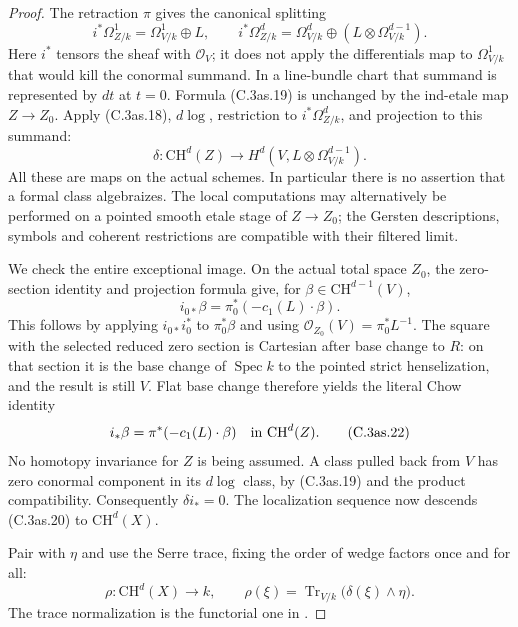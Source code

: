 \begin{proof}
The retraction $\pi$ gives the canonical splitting
\[
 i^*\Omega^1_{Z/k}=\Omega^1_{V/k}\oplus L,\qquad
 i^*\Omega^d_{Z/k}=\Omega^d_{V/k}
                         \oplus(L\otimes\Omega^{d-1}_{V/k}).
 \tag{C.3as.19}
\]
Here $i^*$ tensors the sheaf with $\mathcal O_V$; it does
not apply the differentials map to $\Omega^1_{V/k}$ that
would kill the conormal summand. In a line-bundle chart that
summand is represented by $dt$ at $t=0$. Formula (C.3as.19)
is unchanged by the ind-etale map $Z\to Z_0$.
Apply (C.3as.18), $d\log$, restriction to
$i^*\Omega^d_{Z/k}$, and projection to this summand:
\[
 \delta:\mathrm{CH}^d(Z)\longrightarrow
                     H^d(V,L\otimes\Omega^{d-1}_{V/k}).
 \tag{C.3as.20}
\]
All these are maps on the actual schemes. In particular there
is no assertion that a formal class algebraizes. The local
computations may alternatively be performed on a pointed
smooth etale stage of $Z\to Z_0$; the Gersten descriptions,
symbols and coherent restrictions are compatible with their
filtered limit.

We check the entire exceptional image. On the actual total
space $Z_0$, the zero-section identity and projection formula
give, for $\beta\in\mathrm{CH}^{d-1}(V)$,
\[
                  i_{0*}\beta
                    =\pi_0^*(-c_1(L)\cdot\beta).
 \tag{C.3as.21}
\]
This follows by applying $i_{0*}i_0^*$ to $\pi_0^*\beta$
and using $\mathcal O_{Z_0}(V)=\pi_0^*L^{-1}$.
The square with the selected reduced zero section is
Cartesian after base change to $R$: on that section it is
the base change of $\operatorname{Spec}k$ to the pointed
strict henselization, and the result is still $V$.
Flat base change therefore yields the literal Chow identity
\[
                    i_*\beta=\pi^*(-c_1(L)\cdot\beta)
                                \quad\hbox{in }\mathrm{CH}^d(Z).
 \tag{C.3as.22}
\]
No homotopy invariance for $Z$ is being assumed. A class
pulled back from $V$ has zero conormal component in its
$d\log$ class, by (C.3as.19) and the product compatibility.
Consequently $\delta i_*=0$. The localization sequence
now descends (C.3as.20) to $\mathrm{CH}^d(X)$.

Pair with $\eta$ and use the Serre trace, fixing the order
of wedge factors once and for all:
\[
 \rho:\mathrm{CH}^d(X)\longrightarrow k,\qquad
 \rho(\xi)=\operatorname{Tr}_{V/k}\bigl(\delta(\xi)\wedge\eta\bigr).
 \tag{C.3as.23}
\]
The trace normalization is the functorial one in
\citet[Section~48.27]{D_Stacks0FVU}.


\end{proof}

